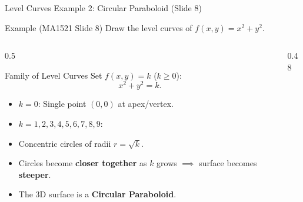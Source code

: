 \documentclass[aspectratio=169,10pt]{beamer}
\begin{document}
\begin{frame}{Level Curves Example 2: Circular Paraboloid (Slide 8)}
  \begin{exampleblock}{Example (MA1521 Slide 8)}
    Draw the level curves of $f(x, y) = x^2 + y^2$.
  \end{exampleblock}

  \begin{columns}[T]
    \begin{column}{0.5\textwidth}
      \begin{block}{Family of Level Curves}
        \small
        Set $f(x, y) = k$ ($k \ge 0$):
        \[
          x^2 + y^2 = k.
        \]
        \begin{itemize}
          \item $k = 0$: Single point $(0, 0)$ at apex/vertex.
          \item $k = 1, 2, 3, 4, 5, 6, 7, 8, 9$:
          \item Concentric circles of radii $r = \sqrt{k}$.
          \item Circles become \textbf{closer together} as $k$ grows $\implies$ surface becomes \textbf{steeper}.
          \item The 3D surface is a \textbf{Circular Paraboloid}.
        \end{itemize}
      \end{block}
    \end{column}

    \begin{column}{0.48\textwidth}
      \centering
    \end{column}
  \end{columns}
\end{frame}
\end{document}
